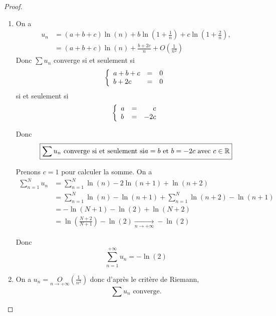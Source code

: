 \documentclass[12pt]{article}
\begin{document}
\begin{proof}
	\phantom{}
	\begin{enumerate}
		\item On a 
		\begin{align*}
			u_{n}
			&=(a+b+c)\ln(n)+b\ln\left(1+\frac{1}{n}\right)+c\ln\left(1+\frac{2}{n}\right),\\
			&=(a+b+c)\ln(n)+\frac{b+2c}{n}+O\left(\frac{1}{n^{2}}\right)
		\end{align*}
		Donc $\sum u_{n}$ converge si et seulement si 
		\begin{equation*}
		\left\{
			\begin{array}[]{lcr}
				a+b+c &= &0\\
				b+2c &= &0
			\end{array}
		\right.
		\end{equation*}
		si et seulement si 
		\begin{equation*}
		\left\{
			\begin{array}[]{lcr}
				a &= &c\\
				b &= &-2c
			\end{array}
		\right.
		\end{equation*}

		Donc 
		\begin{equation*}\boxed{\sum u_{n}\text{ converge si et seulement si} a=b\text{ et }b=-2c\text{ avec }c\in\mathbb{R}}\end{equation*}

		Prenons $c=1$ pour calculer la somme. On a 
		\begin{align*}
			\sum_{n=1}^{N}u_{n}
			&=\sum_{n=1}^{N}\ln(n)-2\ln(n+1)+\ln(n+2)\\
			&=\sum_{n=1}^{N}\ln(n)-\ln(n+1)+\sum_{n=1}^{N}\ln(n+2)-\ln(n+1)\\
			&=-\ln(N+1)-\ln(2)+\ln(N+2)\\
			&=\ln\left(\frac{N+2}{N+1}\right)-\ln(2)\xrightarrow[n\to+\infty]{}-\ln(2)
		\end{align*}

		Donc 
		\begin{equation*}\boxed{\sum_{n=1}^{+\infty}u_{n}=-\ln(2)}\end{equation*}

		\item On a $u_{n}=\underset{n\to+\infty}{O}\left(\frac{1}{n^{2}}\right)$ donc d'après le critère de Riemann,
		\begin{equation*}\boxed{\sum u_{n}\text{ converge.}}\end{equation*}


\end{enumerate}
\end{proof}
\end{document}
